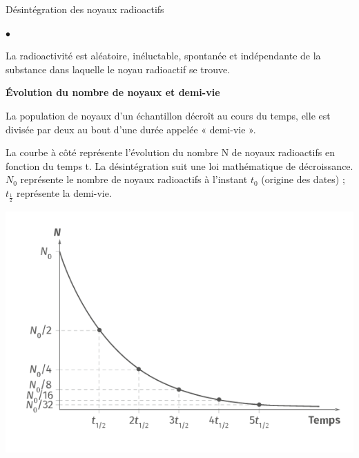 \documentclass[24pt]{article}
\begin{document}
\begin{concept}{Désintégration des noyaux radioactifs }
\begin{list}{$\bullet$}{}
              \vspace{10pt}
        \item La radioactivité est aléatoire, inéluctable, spontanée et indépendante de
              la substance dans laquelle le noyau radioactif se trouve.
    \end{list}

    \begin{center}
        \textbf{Évolution du nombre de noyaux et demi-vie }
    \end{center}

    \begin{minipage}[c]{0.6\textwidth}
        La population de noyaux d’un échantillon décroît au cours du temps,
        elle est divisée par deux au bout d’une durée appelée « demi-vie ».

        La courbe à côté représente l’évolution du nombre N de noyaux radioactifs en fonction
        du temps t. La désintégration suit une loi mathématique de décroissance.
        $N_0$ représente le nombre de noyaux radioactifs à l’instant $t_0$ (origine des dates) ;
        $t_{\frac{1}{2}}$ représente la demi-vie.
    \end{minipage}
    \begin{minipage}[c]{0.4\textwidth}
        \begin{center}
            \includegraphics[width=1\columnwidth]{nuclear4.png}
        \end{center}
    \end{minipage}
\end{concept}
\end{document}
